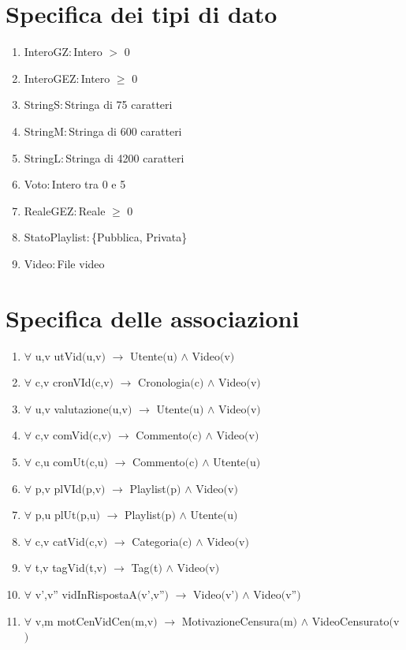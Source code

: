 \documentclass{article}
\begin{document}
\newpage

\section{\label{sec:TipoDiDato}Specifica dei tipi di dato}
\begin{enumerate}
    \item\label{sec:TipoInteroGZ} InteroGZ$: $Intero $>$ 0
    \item\label{sec:TipoInteroGEZ} InteroGEZ$: $Intero $\geq$ 0
    \item\label{sec:TipoStringS} StringS$: $Stringa di 75 caratteri
    \item\label{sec:TipoStringM} StringM$: $Stringa di 600 caratteri
    \item\label{sec:TipoStringL} StringL$: $Stringa di 4200 caratteri
    \item\label{sec:TipoVoto} Voto$: $Intero tra 0 e 5
    \item\label{sec:TipoRealeGEZ} RealeGEZ$: $Reale $\geq$ 0
    \item\label{sec:TipoStatoPlaylist} StatoPlaylist$: $\{Pubblica, Privata\}
    \item\label{sec:TipoVideo} Video$: $File video
\end{enumerate}

\newpage

\section{\label{sec:Associazioni}Specifica delle associazioni}
\begin{enumerate}
    \item $\forall$ u,v utVid$($u,v$)$ $\rightarrow$ Utente$($u$)$ $\land$ Video$($v$)$
    \item $\forall$ c,v cronVId$($c,v$)$ $\rightarrow$ Cronologia$($c$)$ $\land$ Video$($v$)$
    \item $\forall$ u,v valutazione$($u,v$)$ $\rightarrow$ Utente$($u$)$ $\land$ Video$($v$)$
    \item $\forall$ c,v comVid$($c,v$)$ $\rightarrow$ Commento$($c$)$ $\land$ Video$($v$)$
    \item $\forall$ c,u comUt$($c,u$)$ $\rightarrow$ Commento$($c$)$ $\land$ Utente$($u$)$
    \item $\forall$ p,v plVId$($p,v$)$ $\rightarrow$ Playlist$($p$)$ $\land$ Video$($v$)$
    \item $\forall$ p,u plUt$($p,u$)$ $\rightarrow$ Playlist$($p$)$ $\land$ Utente$($u$)$
    \item $\forall$ c,v catVid$($c,v$)$ $\rightarrow$ Categoria$($c$)$ $\land$ Video$($v$)$
    \item $\forall$ t,v tagVid$($t,v$)$ $\rightarrow$ Tag$($t$)$ $\land$ Video$($v$)$
    \item $\forall$ v',v'' vidInRispostaA$($v',v''$)$ $\rightarrow$ Video$($v'$)$ $\land$ Video$($v''$)$
    \item $\forall$ v,m motCenVidCen$($m,v$)$ $\rightarrow$ MotivazioneCensura$($m$)$ $\land$ VideoCensurato$($v$)$
\end{enumerate}
\end{document}
